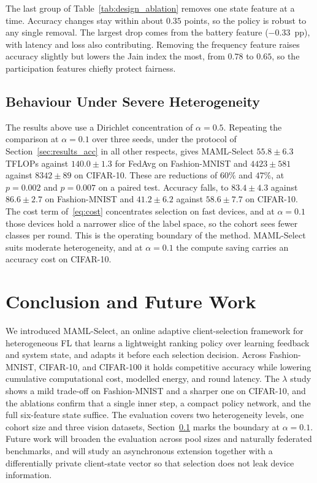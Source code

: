\documentclass[journal]{IEEEtran}
\theoremstyle{remark}
\newcommand{\revision}[1]{#1}
\newcommand{\revtwo}[1]{#1}
\begin{document}
\revision{The last group of Table~\ref{tab:design_ablation} removes one state feature at a time. Accuracy changes stay within about $0.35$ points, so the policy is robust to any single removal. The largest drop comes from the battery feature ($-0.33$~pp), with latency and loss also contributing. Removing the frequency feature raises accuracy slightly but lowers the Jain index the most, from $0.78$ to $0.65$, so the participation features chiefly protect fairness.}

\subsection{\revtwo{Behaviour Under Severe Heterogeneity}}\label{sec:alpha01}
\revtwo{The results above use a Dirichlet concentration of $\alpha=0.5$. Repeating the comparison at $\alpha=0.1$ over three seeds, under the protocol of Section~\ref{sec:results_acc} in all other respects, gives MAML-Select $55.8\pm6.3$ TFLOPs against $140.0\pm1.3$ for FedAvg on Fashion-MNIST and $4423\pm581$ against $8342\pm89$ on CIFAR-10. These are reductions of $60\%$ and $47\%$, at $p=0.002$ and $p=0.007$ on a paired test. Accuracy falls, to $83.4\pm4.3$ against $86.6\pm2.7$ on Fashion-MNIST and $41.2\pm6.2$ against $58.6\pm7.7$ on CIFAR-10. The cost term of~\eqref{eq:cost} concentrates selection on fast devices, and at $\alpha=0.1$ those devices hold a narrower slice of the label space, so the cohort sees fewer classes per round. This is the operating boundary of the method. MAML-Select suits moderate heterogeneity, and at $\alpha=0.1$ the compute saving carries an accuracy cost on CIFAR-10.}

\FloatBarrier
\section{Conclusion and Future Work}
\revision{We introduced MAML-Select, an online adaptive client-selection framework for heterogeneous FL that learns a lightweight ranking policy over learning feedback and system state, and adapts it before each selection decision.
Across Fashion-MNIST, CIFAR-10, and CIFAR-100 it holds competitive accuracy while lowering cumulative computational cost, modelled energy, and round latency. The $\lambda$ study shows a mild trade-off on Fashion-MNIST and a sharper one on CIFAR-10, and the ablations confirm that a single inner step, a compact policy network, and the full six-feature state suffice.} \revtwo{The evaluation covers two heterogeneity levels, one cohort size and three vision datasets, Section~\ref{sec:alpha01} marks the boundary at $\alpha=0.1$.} \revision{Future work will broaden the evaluation across pool sizes and naturally federated benchmarks, and will study an asynchronous extension together with a differentially private client-state vector so that selection does not leak device information.}
\end{document}
